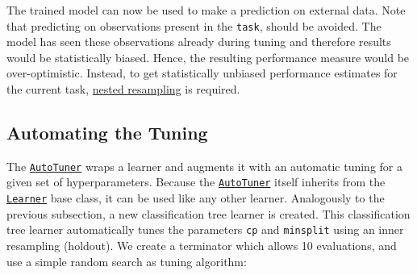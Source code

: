 \documentclass[]{scrbook}
\newenvironment{Shaded}{\begin{snugshade}}{\end{snugshade}}
\newcommand{\KeywordTok}[1]{\textcolor[rgb]{0.13,0.29,0.53}{\textbf{#1}}}
\newcommand{\NormalTok}[1]{#1}
\newcommand{\OperatorTok}[1]{\textcolor[rgb]{0.81,0.36,0.00}{\textbf{#1}}}
\newcommand{\StringTok}[1]{\textcolor[rgb]{0.31,0.60,0.02}{#1}}
\renewenvironment{Shaded} {\begin{snugshade}\small} {\end{snugshade}}
\begin{document}
\begin{Shaded}
\end{Shaded}

The trained model can now be used to make a prediction on external data.
Note that predicting on observations present in the \texttt{task}, should be avoided.
The model has seen these observations already during tuning and therefore results would be statistically biased.
Hence, the resulting performance measure would be over-optimistic.
Instead, to get statistically unbiased performance estimates for the current task, \protect\hyperlink{nested-resamling}{nested resampling} is required.

\hypertarget{autotuner}{%
\subsection{Automating the Tuning}\label{autotuner}}

The \href{https://mlr3tuning.mlr-org.com/reference/AutoTuner.html}{\texttt{AutoTuner}} wraps a learner and augments it with an automatic tuning for a given set of hyperparameters.
Because the \href{https://mlr3tuning.mlr-org.com/reference/AutoTuner.html}{\texttt{AutoTuner}} itself inherits from the \href{https://mlr3.mlr-org.com/reference/Learner.html}{\texttt{Learner}} base class, it can be used like any other learner.
Analogously to the previous subsection, a new classification tree learner is created.
This classification tree learner automatically tunes the parameters \texttt{cp} and \texttt{minsplit} using an inner resampling (holdout).
We create a terminator which allows 10 evaluations, and use a simple random search as tuning algorithm:
\end{document}
